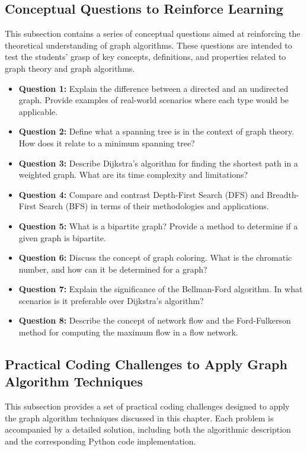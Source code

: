 \documentclass[12pt]{book} %
\begin{document}
\subsection{Conceptual Questions to Reinforce Learning}
This subsection contains a series of conceptual questions aimed at reinforcing the theoretical understanding of graph algorithms. These questions are intended to test the students' grasp of key concepts, definitions, and properties related to graph theory and graph algorithms.

\begin{itemize}
    \item \textbf{Question 1:} Explain the difference between a directed and an undirected graph. Provide examples of real-world scenarios where each type would be applicable.
    \item \textbf{Question 2:} Define what a spanning tree is in the context of graph theory. How does it relate to a minimum spanning tree?
    \item \textbf{Question 3:} Describe Dijkstra's algorithm for finding the shortest path in a weighted graph. What are its time complexity and limitations?
    \item \textbf{Question 4:} Compare and contrast Depth-First Search (DFS) and Breadth-First Search (BFS) in terms of their methodologies and applications.
    \item \textbf{Question 5:} What is a bipartite graph? Provide a method to determine if a given graph is bipartite.
    \item \textbf{Question 6:} Discuss the concept of graph coloring. What is the chromatic number, and how can it be determined for a graph?
    \item \textbf{Question 7:} Explain the significance of the Bellman-Ford algorithm. In what scenarios is it preferable over Dijkstra's algorithm?
    \item \textbf{Question 8:} Describe the concept of network flow and the Ford-Fulkerson method for computing the maximum flow in a flow network.
\end{itemize}

\subsection{Practical Coding Challenges to Apply Graph Algorithm Techniques}
This subsection provides a set of practical coding challenges designed to apply the graph algorithm techniques discussed in this chapter. Each problem is accompanied by a detailed solution, including both the algorithmic description and the corresponding Python code implementation.
\end{document}
